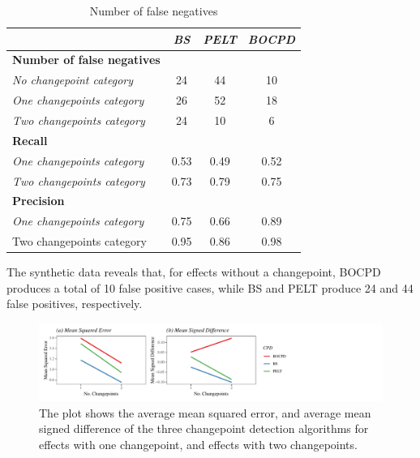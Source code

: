 \documentclass[]{interact}
\theoremstyle{plain}%
\theoremstyle{definition}
\theoremstyle{remark}
\begin{document}
{	\begin{table}[H]
		\centering
		\renewcommand{\arraystretch}{1.2} %
		\small
		\begin{tabular}{lccc}
			\hline
			& \textit{BS} & \textit{PELT} & \textit{BOCPD} \\ \hline
			\textbf{Number of false negatives} &             &               &                \\
			\textit{No changepoint category}   & 24          & 44            & 10             \\
			\textit{One changepoints category} & 26          & 52            & 18             \\
			\textit{Two changepoints category} & 24          & 10            & 6              \\
			\textbf{Recall}                    &             &               &                \\
			\textit{One changepoints category} & 0.53        & 0.49          & 0.52           \\
			\textit{Two changepoints category} & 0.73        & 0.79          & 0.75           \\
			\textbf{Precision}                 &             &               &                \\
			\textit{One changepoints category} & 0.75        & 0.66          & 0.89           \\
			Two changepoints category          & 0.95        & 0.86          & 0.98           \\ \hline
		\end{tabular}
	\caption{Number of false negatives}
	\label{a}
	\end{table}

    The synthetic data reveals that, for effects without a changepoint, BOCPD produces a total of 10 false positive cases, while BS and PELT produce 24 and 44 false positives, respectively.
    
    \begin{figure}[H]
    	\captionsetup{justification=raggedright}
    	\renewcommand{\figurename}{Figure}
    	\centering
    	\includegraphics[width=\textwidth,height=\textheight,keepaspectratio]{MSEMSD}
    	\caption{\fontsize{8}{10}\selectfont The plot shows the average mean squared error, and average mean signed difference of the three changepoint detection algorithms for effects with one changepoint, and effects with two changepoints.}
    	\label{Figure 4}
    \end{figure}

}
\end{document}
